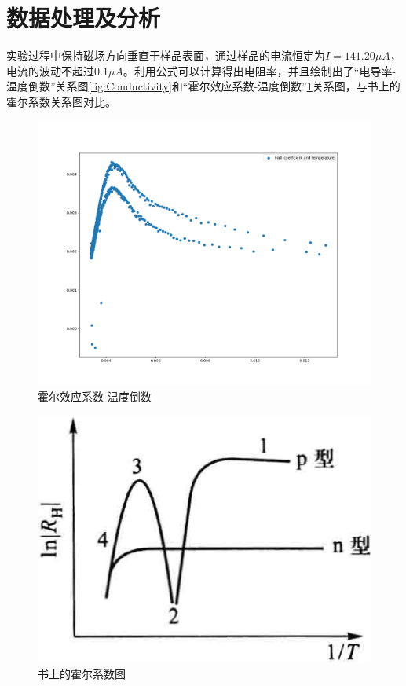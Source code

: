 \documentclass{buaaemp}
\begin{document}
\section{数据处理及分析}
实验过程中保持磁场方向垂直于样品表面，通过样品的电流恒定为$I=141.20\mu A$，电流的波动不超过$0.1\mu A$。利用公式可以计算得出电阻率，并且绘制出了“电导率-温度倒数”关系图\ref{fig:Conductivity}和“霍尔效应系数-温度倒数”\ref{fig:Hall_coefficient}关系图，与书上的霍尔系数关系图对比。

\begin{figure}
    \centering
    \includegraphics[width=\linewidth]{image/Hall_coefficient.png}
    \caption{霍尔效应系数-温度倒数}
    \label{fig:Hall_coefficient}
\end{figure}

\begin{figure}
    \centering
    \includegraphics[width=\linewidth]{image/bookhall.png}
    \caption{书上的霍尔系数图}
    \label{fig:bookhall}
\end{figure}
\end{document}
